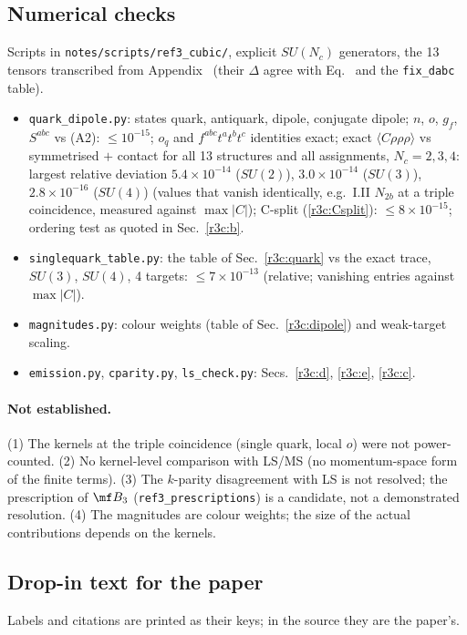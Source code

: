\subsection{Numerical checks}\label{r3c:num}
Scripts in \texttt{notes/scripts/ref3\_cubic/}, explicit $SU(N_c)$ generators, the 13 tensors transcribed from Appendix~ (their $\Delta$ agree with Eq.~ and the \texttt{fix\_dabc} table).
\begin{itemize}
\item \texttt{quark\_dipole.py}: states quark, antiquark, dipole, conjugate dipole; $n$, $o$, $g_f$, $S^{abc}$ vs (A2): $\le10^{-15}$; $o_q$ and $f^{abc}t^at^bt^c$ identities exact; exact $\langle C\rho\rho\rho\rangle$ vs symmetrised $+$ contact for all 13 structures and all assignments, $N_c=2,3,4$: largest relative deviation $5.4\times10^{-14}$ ($SU(2)$), $3.0\times10^{-14}$ ($SU(3)$), $2.8\times10^{-16}$ ($SU(4)$) (values that vanish identically, e.g.\ I.II $N_{2b}$ at a triple coincidence, measured against $\max|C|$); C-split (\ref{r3c:Csplit}): $\le8\times10^{-15}$; ordering test as quoted in Sec.~\ref{r3c:b}.
\item \texttt{singlequark\_table.py}: the table of Sec.~\ref{r3c:quark} vs the exact trace, $SU(3)$, $SU(4)$, 4 targets: $\le7\times10^{-13}$ (relative; vanishing entries against $\max|C|$).
\item \texttt{magnitudes.py}: colour weights (table of Sec.~\ref{r3c:dipole}) and weak-target scaling.
\item \texttt{emission.py}, \texttt{cparity.py}, \texttt{ls\_check.py}: Secs.~\ref{r3c:d}, \ref{r3c:e}, \ref{r3c:c}.
\end{itemize}
\paragraph{Not established.} (1) The kernels at the triple coincidence (single quark, local $o$) were not power-counted. (2) No kernel-level comparison with LS/MS (no momentum-space form of the finite terms). (3) The $k$-parity disagreement with LS is not resolved; the prescription of $\mf B_3$ (\texttt{ref3\_prescriptions}) is a candidate, not a demonstrated resolution. (4) The magnitudes are colour weights; the size of the actual contributions depends on the kernels.

\subsection{Drop-in text for the paper}\label{r3c:dropin}
\begingroup{}\providecommand{\Kv}{\mathcal K}\renewcommand{\eqref}[1]{(\texttt{\detokenize{#1}})}\renewcommand{\ref}[1]{\texttt{\detokenize{#1}}}\renewcommand{\cite}[1]{[\texttt{\detokenize{#1}}]}
\noindent Labels and citations are printed as their keys; in the source they are the paper's.

